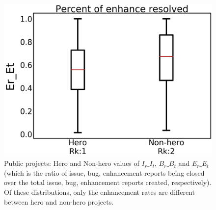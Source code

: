 \documentclass[sigconf]{acmart}
\theoremstyle{break}
\begin{document}
\begin{figure}[!t]
\begin{minipage}{.33\linewidth}
        \includegraphics[width=\linewidth]{./fig/Er_Et.png}
    \end{minipage}%
    \caption{Public projects:  Hero and Non-hero values of $I_r\_I_t$, $B_r\_B_t$ and $E_r\_E_t$ (which is the ratio of issue, bug, enhancement reports being closed over the total issue, bug, enhancement reports created, respectively). Of these distributions, only the enhancement rates are different between hero and non-hero projects.}
    \label{fig:ratio_public}
\end{figure}
\end{document}
